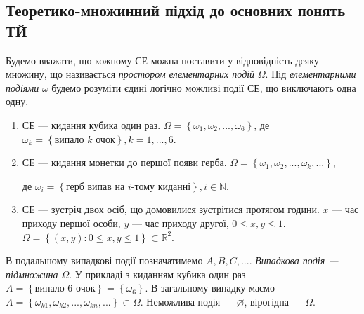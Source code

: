 \subsection*{Теоретико-множинний підхід до основних понять ТЙ}
Будемо вважати, що кожному СЕ можна поставити у відповідність деяку множину, що
називається \emph{простором елементарних подій} $\Omega$. 
Під \emph{елементарними подіями} $\omega$ будемо розуміти єдині
логічно можливі події СЕ, що виключають одна одну.
\begin{example}
    \begin{enumerate}
        \mbox{}
        \item СЕ --- кидання кубика один раз. 
        $\Omega = \left\{\omega_1, \omega_2, ..., \omega_6\right\}$, 
        де $\omega_k = \left\{\text{випало } k \text{ очок}\right\}, k = 1,...,6$.
        \item СЕ --- кидання монетки до першої появи герба.
        $\Omega = \left\{\omega_1, \omega_2, ..., \omega_k, ...\right\}$, 
        
        де $\omega_i = \left\{\text{герб випав на }i\text{-тому киданні}\right\}, i\in \mathbb{N}$.
        \item СЕ --- зустріч двох осіб, що домовилися зустрітися протягом години.
        $x$ --- час приходу першої особи, $y$ --- час приходу другої, $0\leq x, y \leq 1$.
        $\Omega = \left\{ \left( x, y\right): 0\leq x, y \leq 1\right\}\subset \mathbb{R}^2$.
    \end{enumerate}
\end{example}
В подальшому випадкові події позначатимемо $A, B, C, ...$. 
\emph{Випадкова подія --- підмножина $\Omega$}. 
У прикладі з киданням кубика один раз $A = \left\{\text{випало }6\text{ очок}\right\} = \left\{ \omega_6\right\}$.
В загальному випадку маємо $A = \left\{\omega_{k1}, \omega_{k2}, ..., \omega_{kn}, ...\right\} \subset \Omega$.
Неможлива подія --- $\varnothing$, вірогідна --- $\Omega$. 

